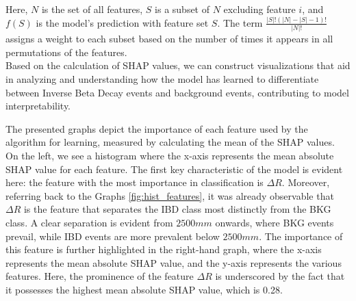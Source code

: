 Here, \(N\) is the set of all features, \(S\) is a subset of \(N\) excluding feature \(i\), and \(f(S)\) is the model's prediction with feature set \(S\). The term \(\frac{|S|!(|N| - |S| - 1)!}{|N|!}\) assigns a weight to each subset based on the number of times it appears in all permutations of the features.\\



Based on the calculation of SHAP values, we can construct visualizations that aid in analyzing and understanding how the model has learned to differentiate between Inverse Beta Decay events and background events, contributing to model interpretability. 

\begin{figure}[h!]
	\centering
	
	
\end{figure}


The presented graphs depict the importance of each feature used by the algorithm for learning, measured by calculating the mean of the SHAP values. On the left, we see a histogram where the x-axis represents the mean absolute SHAP value for each feature. The first key characteristic of the model is evident here: the feature with the most importance in classification is $\Delta R$. Moreover, referring back to the Graphs \ref{fig:hist_features}, it was already observable that $\Delta R$ is the feature that separates the IBD class most distinctly from the BKG class. A clear separation is evident from $2500 mm$ onwards, where BKG events prevail, while IBD events are more prevalent below $2500 mm$. The importance of this feature is further highlighted in the right-hand graph, where the x-axis represents the mean absolute SHAP value, and the y-axis represents the various features. Here, the prominence of the feature $\Delta R$ is underscored by the fact that it possesses the highest mean absolute SHAP value, which is 0.28.  \\

